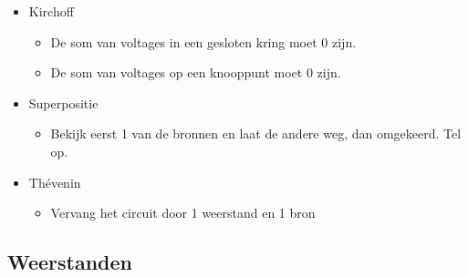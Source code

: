 \documentclass[11pt]{article}
\let\originalitem\item
\renewcommand{\item}{\originalitem[]}
\newcommand{\Newpage}{\end{preview}\begin{preview}}
\begin{document}
\begin{preview}
\begin{itemize}
	\item Kirchoff
	\begin{itemize}
		\item De som van voltages in een gesloten kring moet 0 zijn.
		\item De som van voltages op een knooppunt moet 0 zijn.
	\end{itemize}
	\item Superpositie
	\begin{itemize}
		\item Bekijk eerst 1 van de bronnen en laat de andere weg, dan omgekeerd. Tel op.
	\end{itemize}
	\item Th\'evenin
	\begin{itemize}
		\item Vervang het circuit door 1 weerstand en 1 bron
	\end{itemize}
\end{itemize}

\Newpage
\section{Weerstanden}


\end{preview}
\end{document}
